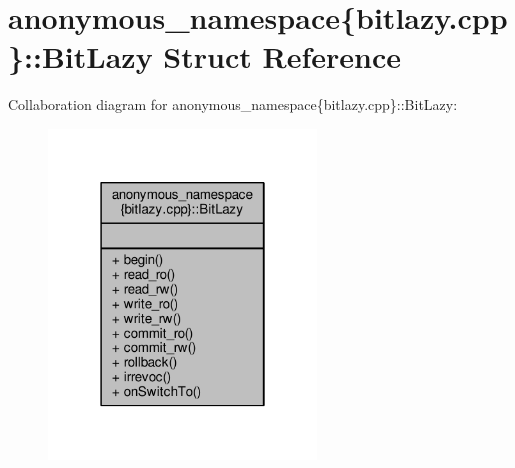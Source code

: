 \hypertarget{structanonymous__namespace_02bitlazy_8cpp_03_1_1BitLazy}{\section{anonymous\-\_\-namespace\{bitlazy.\-cpp\}\-:\-:Bit\-Lazy Struct Reference}
\label{structanonymous__namespace_02bitlazy_8cpp_03_1_1BitLazy}
}


Collaboration diagram for anonymous\-\_\-namespace\{bitlazy.\-cpp\}\-:\-:Bit\-Lazy\-:
\nopagebreak
\begin{figure}[H]
\begin{center}
\leavevmode
\includegraphics[width=202pt]{structanonymous__namespace_02bitlazy_8cpp_03_1_1BitLazy__coll__graph}
\end{center}
\end{figure}
